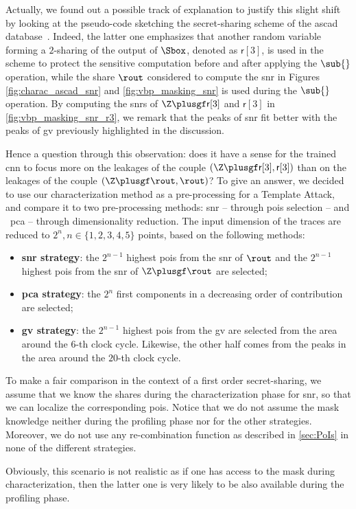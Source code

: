 Actually, we found out a possible track of explanation to justify this slight shift by looking at the pseudo-code sketching the secret-sharing scheme of the \gls{ascad} database~\cite[Alg.~1]{prouff_study_2018}.
Indeed, the latter one emphasizes that another random variable forming a \(2\)-sharing of the output of \(\Sbox\), denoted as \(\mathsf{r}[3]\), is used in the scheme to protect the sensitive computation before and after applying the \(\sub{}\) operation, while the share \(\rout\) considered to compute the \gls{snr} in Figures \ref{fig:charac_ascad_snr} and \ref{fig:vbp_masking_snr} is used during the \(\sub{}\) operation.
By computing the \glspl{snr} of \(\Z \plusgf \mathsf{r}[3]\) and \(\mathsf{r}[3]\) in \autoref{fig:vbp_masking_snr_r3}, we remark that the peaks of \gls{snr} fit better with the peaks of \gls{gv} previously highlighted in the discussion.


Hence a question through this observation: does it have a sense for the trained \gls{cnn} to focus more on the leakages of the couple \((\Z \plusgf \mathsf{r}[3], \mathsf{r}[3])\) than on the leakages of the couple \((\Z \plusgf \rout, \rout)\)?
To give an answer, we decided to use our characterization method as a pre-processing for a Template Attack, and compare it to two pre-processing methods: \gls{snr} -- through \glspl{poi} selection -- and  \gls{pca} -- through dimensionality reduction.
The input dimension of the traces are reduced to \(2^n, n \in \{1, 2, 3, 4, 5\}\) points, based on the following methods:
\begin{itemize}
	\item \textbf{\gls{snr} strategy}: the \(2^{n-1}\) highest \glspl{poi} from the \gls{snr} of \(\rout\) and the \(2^{n-1}\) highest \glspl{poi} from the \gls{snr} of \(\Z \plusgf \rout\) are selected;
	\item \textbf{\gls{pca} strategy}: the \(2^n\) first components in a decreasing order of contribution are selected; 
	\item \textbf{\gls{gv} strategy}: the \(2^{n-1}\) highest \glspl{poi} from the \gls{gv} are selected from the area around the \(6\)-th clock cycle.
    Likewise, the other half comes from the peaks in the area around the \(20\)-th clock cycle.
\end{itemize}

\begin{remark}
    To make a fair comparison in the context of a first order secret-sharing, we assume that we know the shares during the characterization phase for \gls{snr}, so that we can localize the corresponding \glspl{poi}.
    Notice that we do not assume the mask knowledge neither during the profiling phase nor for the other strategies.
    Moreover, we do not use any re-combination function as described in \autoref{sec:PoIs} in none of the different strategies.

    Obviously, this scenario is not realistic as if one has access to the mask during characterization, then the latter one is very likely to be also available during the profiling phase.
\end{remark}


